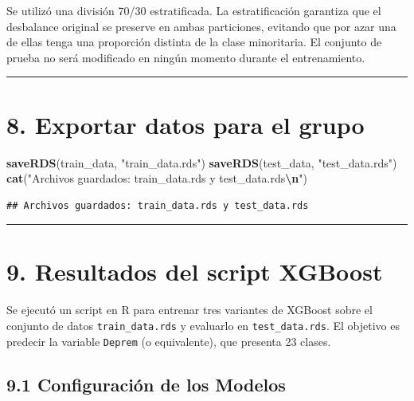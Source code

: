 \documentclass[
]{article}
\newenvironment{Shaded}{\begin{snugshade}}{\end{snugshade}}
\newcommand{\FunctionTok}[1]{\textcolor[rgb]{0.13,0.29,0.53}{\textbf{#1}}}
\newcommand{\NormalTok}[1]{#1}
\newcommand{\SpecialCharTok}[1]{\textcolor[rgb]{0.81,0.36,0.00}{\textbf{#1}}}
\newcommand{\StringTok}[1]{\textcolor[rgb]{0.31,0.60,0.02}{#1}}
\begin{document}
Se utilizó una división 70/30 estratificada. La estratificación
garantiza que el desbalance original se preserve en ambas particiones,
evitando que por azar una de ellas tenga una proporción distinta de la
clase minoritaria. El conjunto de prueba no será modificado en ningún
momento durante el entrenamiento.

\begin{center}\rule{0.5\linewidth}{0.5pt}\end{center}

\section{8. Exportar datos para el
grupo}\label{exportar-datos-para-el-grupo}

\begin{Shaded}
\begin{Highlighting}[]
\FunctionTok{saveRDS}\NormalTok{(train\_data, }\StringTok{"train\_data.rds"}\NormalTok{)}
\FunctionTok{saveRDS}\NormalTok{(test\_data,  }\StringTok{"test\_data.rds"}\NormalTok{)}
\FunctionTok{cat}\NormalTok{(}\StringTok{"Archivos guardados: train\_data.rds y test\_data.rds}\SpecialCharTok{\textbackslash{}n}\StringTok{"}\NormalTok{)}
\end{Highlighting}
\end{Shaded}

\begin{verbatim}
## Archivos guardados: train_data.rds y test_data.rds
\end{verbatim}

\begin{center}\rule{0.5\linewidth}{0.5pt}\end{center}

\section{9. Resultados del script
XGBoost}\label{resultados-del-script-xgboost}

Se ejecutó un script en R para entrenar tres variantes de XGBoost sobre
el conjunto de datos \texttt{train\_data.rds} y evaluarlo en
\texttt{test\_data.rds}. El objetivo es predecir la variable
\texttt{Deprem} (o equivalente), que presenta 23 clases.

\subsection{9.1 Configuración de los
Modelos}\label{configuraciuxf3n-de-los-modelos}
\end{document}
